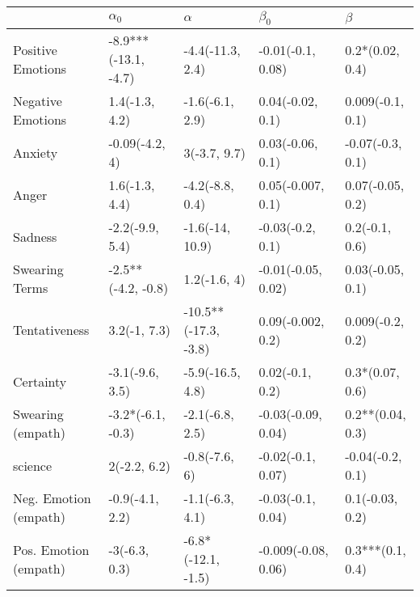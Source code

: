 \begin{tabular}{lllll}
\toprule
{} &            $\alpha_0$ &              $\alpha$ &            $\beta_0$ &           $\beta$ \\
\midrule
Positive Emotions     &  -8.9***(-13.1, -4.7) &      -4.4(-11.3, 2.4) &    -0.01(-0.1, 0.08) &   0.2*(0.02, 0.4) \\
Negative Emotions     &        1.4(-1.3, 4.2) &       -1.6(-6.1, 2.9) &     0.04(-0.02, 0.1) &  0.009(-0.1, 0.1) \\
Anxiety               &        -0.09(-4.2, 4) &          3(-3.7, 9.7) &     0.03(-0.06, 0.1) &  -0.07(-0.3, 0.1) \\
Anger                 &        1.6(-1.3, 4.4) &       -4.2(-8.8, 0.4) &    0.05(-0.007, 0.1) &  0.07(-0.05, 0.2) \\
Sadness               &       -2.2(-9.9, 5.4) &       -1.6(-14, 10.9) &     -0.03(-0.2, 0.1) &    0.2(-0.1, 0.6) \\
Swearing Terms        &    -2.5**(-4.2, -0.8) &          1.2(-1.6, 4) &   -0.01(-0.05, 0.02) &  0.03(-0.05, 0.1) \\
Tentativeness         &          3.2(-1, 7.3) &  -10.5**(-17.3, -3.8) &    0.09(-0.002, 0.2) &  0.009(-0.2, 0.2) \\
Certainty             &       -3.1(-9.6, 3.5) &      -5.9(-16.5, 4.8) &      0.02(-0.1, 0.2) &   0.3*(0.07, 0.6) \\
Swearing (empath)     &     -3.2*(-6.1, -0.3) &       -2.1(-6.8, 2.5) &   -0.03(-0.09, 0.04) &  0.2**(0.04, 0.3) \\
science               &          2(-2.2, 6.2) &         -0.8(-7.6, 6) &    -0.02(-0.1, 0.07) &  -0.04(-0.2, 0.1) \\
Neg. Emotion (empath) &       -0.9(-4.1, 2.2) &       -1.1(-6.3, 4.1) &    -0.03(-0.1, 0.04) &   0.1(-0.03, 0.2) \\
Pos. Emotion (empath) &         -3(-6.3, 0.3) &    -6.8*(-12.1, -1.5) &  -0.009(-0.08, 0.06) &  0.3***(0.1, 0.4) \\
\bottomrule
\end{tabular}
